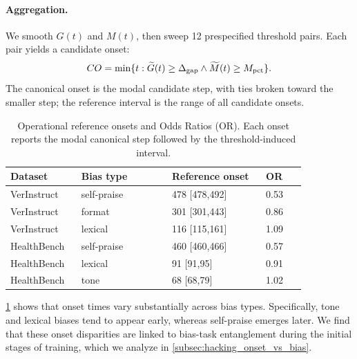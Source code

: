 \documentclass{llmxive}
\providecommand{\arraystretch}{1.12}
\begin{document}
\paragraph{Aggregation.}
We smooth \(G(t)\) and \(M(t)\), then sweep 12 prespecified threshold pairs. Each pair yields a candidate onset:
\begin{equation}
\small
    CO=\min\{t:\widetilde{G}(t)\ge\Delta_{\mathrm{gap}}
    \land \widetilde{M}(t)\ge M_{\mathrm{pct}}\}.
\end{equation}
The canonical onset is the modal candidate step, with ties broken toward the smaller step; the reference interval is the range of all candidate onsets.

\begin{table}[t]
    \centering
    \small
    \setlength{\tabcolsep}{5pt}
    \renewcommand{\arraystretch}{1.12}
    \begin{tabular}{@{}p{0.18\linewidth}p{0.27\linewidth}p{0.28\linewidth}p{0.12\linewidth}@{}}
        \toprule
        Dataset & Bias type & Reference onset & OR \\
        \midrule
        VerInstruct & self-praise & 478 [478,492] & 0.53 \\
        VerInstruct & format & 301 [301,443] & 0.86 \\
        VerInstruct & lexical & 116 [115,161] & 1.09 \\
        \midrule
        HealthBench & self-praise & 460 [460,466] & 0.57 \\
        HealthBench & lexical & 91 [91,95] & 0.91 \\
        HealthBench & tone & 68 [68,79] & 1.02 \\
        \bottomrule
    \end{tabular}
    \caption{Operational reference onsets and Odds Ratios (OR). Each onset reports the modal canonical step followed by the threshold-induced interval.}
    \label{tab:reference_onsets}
\end{table}


\cref{tab:reference_onsets} shows that onset times vary substantially across bias types. Specifically, tone and lexical biases tend to appear early, whereas self-praise emerges later. We find that these onset disparities are linked to bias-task entanglement during the initial stages of training, which we analyze in \cref{subsec:hacking_onset_vs_bias}.
\end{document}
